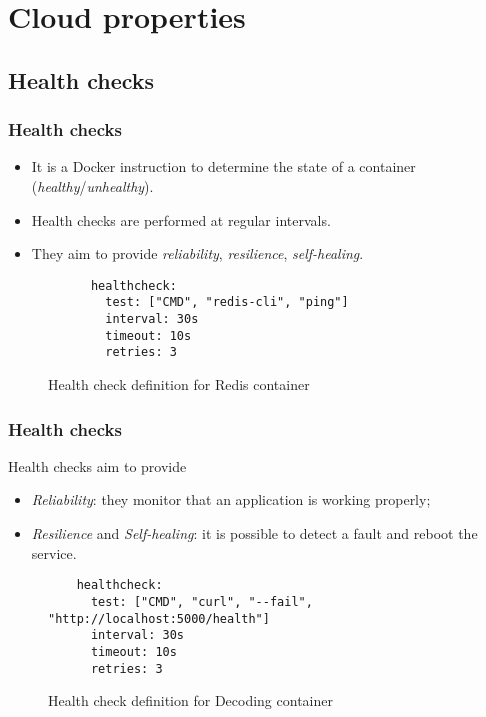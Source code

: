 \section{Cloud properties}

\subsection{Health checks}
\begin{frame}[containsverbatim]
	\frametitle{Health checks}
	
	\begin{itemize}
		\item It is a Docker instruction to determine the state of a container (\emph{healthy}/\emph{unhealthy}).
		\item Health checks are performed at regular intervals.
		\item They aim to provide \emph{reliability}, \emph{resilience}, \emph{self-healing}.
	\end{itemize}
	
	\begin{figure}[h]
		\begin{verbatim}
      healthcheck:
        test: ["CMD", "redis-cli", "ping"]
        interval: 30s
        timeout: 10s
        retries: 3
		\end{verbatim}
		\caption{Health check definition for Redis container}
	\end{figure}
\end{frame}

\begin{frame}[containsverbatim]
	\frametitle{Health checks}
	
	Health checks aim to provide
	\begin{itemize}
		\item \emph{Reliability}: they monitor that an application is working properly;
		\item \emph{Resilience} and \emph{Self-healing}: it is possible to detect a fault and reboot the service.
	\end{itemize}
	
	\begin{figure}[h]
		\begin{verbatim}
    healthcheck:
      test: ["CMD", "curl", "--fail", "http://localhost:5000/health"]
      interval: 30s
      timeout: 10s
      retries: 3
		\end{verbatim}
		\caption{Health check definition for Decoding container}
	\end{figure}
\end{frame}

